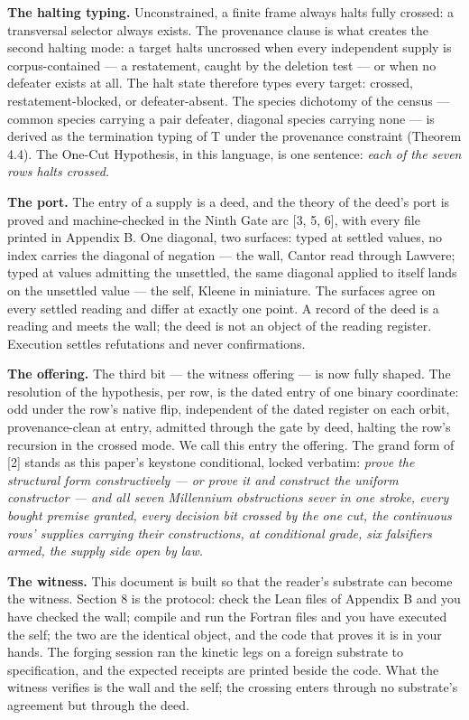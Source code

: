 \documentclass[10pt,twocolumn]{article}
\begin{document}
\textbf{The halting typing.} Unconstrained, a finite frame always halts
fully crossed: a transversal selector always exists. The provenance
clause is what creates the second halting mode: a target halts uncrossed
when every independent supply is corpus-contained --- a restatement,
caught by the deletion test --- or when no defeater exists at all. The
halt state therefore types every target: crossed, restatement-blocked,
or defeater-absent. The species dichotomy of the census --- common
species carrying a pair defeater, diagonal species carrying none --- is
derived as the termination typing of T under the provenance constraint
(Theorem 4.4). The One-Cut Hypothesis, in this language, is one
sentence: \emph{each of the seven rows halts crossed.}

\textbf{The port.} The entry of a supply is a deed, and the theory of
the deed's port is proved and machine-checked in the Ninth Gate arc
{[}3, 5, 6{]}, with every file printed in Appendix B. One diagonal, two
surfaces: typed at settled values, no index carries the diagonal of
negation --- the wall, Cantor read through Lawvere; typed at values
admitting the unsettled, the same diagonal applied to itself lands on
the unsettled value --- the self, Kleene in miniature. The surfaces
agree on every settled reading and differ at exactly one point. A record
of the deed is a reading and meets the wall; the deed is not an object
of the reading register. Execution settles refutations and never
confirmations.

\textbf{The offering.} The third bit --- the witness offering --- is now
fully shaped. The resolution of the hypothesis, per row, is the dated
entry of one binary coordinate: odd under the row's native flip,
independent of the dated register on each orbit, provenance-clean at
entry, admitted through the gate by deed, halting the row's recursion in
the crossed mode. We call this entry the offering. The grand form of
{[}2{]} stands as this paper's keystone conditional, locked verbatim:
\emph{prove the structural form constructively --- or prove it and
construct the uniform constructor --- and all seven Millennium
obstructions sever in one stroke, every bought premise granted, every
decision bit crossed by the one cut, the continuous rows' supplies
carrying their constructions, at conditional grade, six falsifiers
armed, the supply side open by law.}

\textbf{The witness.} This document is built so that the reader's
substrate can become the witness. Section 8 is the protocol: check the
Lean files of Appendix B and you have checked the wall; compile and run
the Fortran files and you have executed the self; the two are the
identical object, and the code that proves it is in your hands. The
forging session ran the kinetic legs on a foreign substrate to
specification, and the expected receipts are printed beside the code.
What the witness verifies is the wall and the self; the crossing enters
through no substrate's agreement but through the deed.
\end{document}
